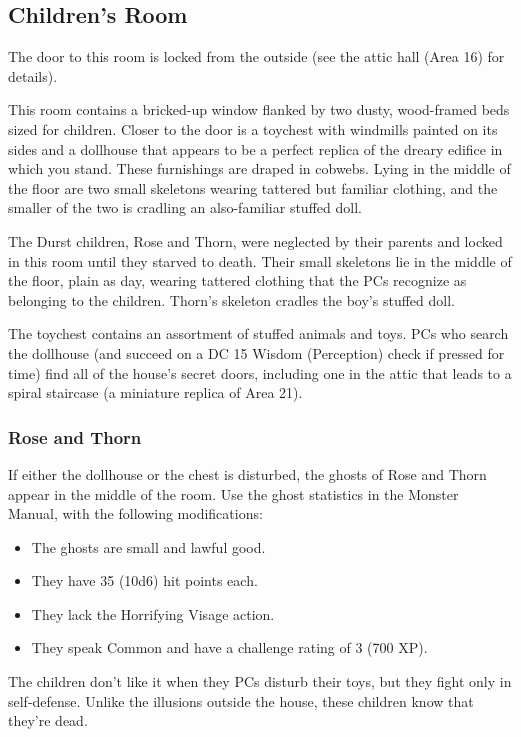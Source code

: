 \subsection{Children's Room}
\label{sec:ChildrensRoom}
The door to this room is locked from the outside (see the attic hall (Area 16) for details).
\begin{readout}
  This room contains a bricked-up window flanked by two dusty, wood-framed beds sized for children. Closer
  to the door is a toychest with windmills painted on its sides and a dollhouse that appears to be a perfect
  replica of the dreary edifice in which you stand. These furnishings are draped in cobwebs. Lying in the
  middle of the floor are two small skeletons wearing tattered but familiar clothing, and the smaller of the
  two is cradling an also-familiar stuffed doll.
\end{readout}
The Durst children, Rose and Thorn, were neglected by their parents and locked in this room until they starved
to death. Their small skeletons lie in the middle of the floor, plain as day, wearing tattered clothing that
the PCs recognize as belonging to the children. Thorn's skeleton cradles the boy's stuffed doll.

The toychest contains an assortment of stuffed animals and toys. PCs who search the dollhouse (and succeed
on a DC 15 Wisdom (Perception) check if pressed for time) find all of the house's secret doors, including
one in the attic that leads to a spiral staircase (a miniature replica of Area 21).

\subsubsection*{Rose and Thorn}
If either the dollhouse or the chest is disturbed, the ghosts of Rose and Thorn appear in the middle of
the room. Use the ghost statistics in the Monster Manual, with the following modifications:
\begin{itemize}
  \item The ghosts are small and lawful good.
  \item They have 35 (10d6) hit points each.
  \item They lack the Horrifying Visage action.
  \item They speak Common and have a challenge rating of 3 (700 XP).
\end{itemize}
The children don't like it when they PCs disturb their toys, but they fight only in self-defense. Unlike the
illusions outside the house, these children know that they're dead.

